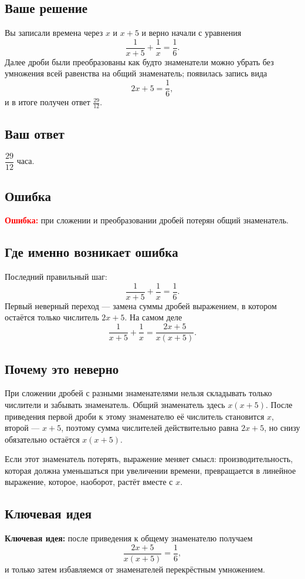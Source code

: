 \documentclass[12pt,a4paper]{article}
\newcommand{\err}{\textcolor{red}{\textbf{Ошибка:}}}
\newcommand{\idea}{\textcolor{blue!60!black}{\textbf{Ключевая идея:}}}
\begin{document}
\subsection*{Ваше решение}
Вы записали времена через $x$ и $x+5$ и верно начали с уравнения
\[
\frac{1}{x+5}+\frac{1}{x}=\frac{1}{6}.
\]
Далее дроби были преобразованы как будто знаменатели можно убрать без умножения всей равенства на общий знаменатель; появилась запись вида
\[
2x+5=\frac{1}{6},
\]
и в итоге получен ответ $\frac{29}{12}$.

\subsection*{Ваш ответ}
$\dfrac{29}{12}$ часа.

\subsection*{Ошибка}
\err{} при сложении и преобразовании дробей потерян общий знаменатель.

\subsection*{Где именно возникает ошибка}
Последний правильный шаг:
\[
\frac{1}{x+5}+\frac{1}{x}=\frac{1}{6}.
\]
Первый неверный переход --- замена суммы дробей выражением, в котором остаётся только числитель $2x+5$. На самом деле
\[
\frac{1}{x+5}+\frac{1}{x}=\frac{2x+5}{x(x+5)}.
\]

\subsection*{Почему это неверно}
При сложении дробей с разными знаменателями нельзя складывать только числители и забывать знаменатель. Общий знаменатель здесь $x(x+5)$. После приведения первой дроби к этому знаменателю её числитель становится $x$, второй --- $x+5$, поэтому сумма числителей действительно равна $2x+5$, но снизу обязательно остаётся $x(x+5)$.

Если этот знаменатель потерять, выражение меняет смысл: производительность, которая должна уменьшаться при увеличении времени, превращается в линейное выражение, которое, наоборот, растёт вместе с $x$.

\subsection*{Ключевая идея}
\idea{} после приведения к общему знаменателю получаем
\[
\frac{2x+5}{x(x+5)}=\frac{1}{6},
\]
и только затем избавляемся от знаменателей перекрёстным умножением.
\end{document}
